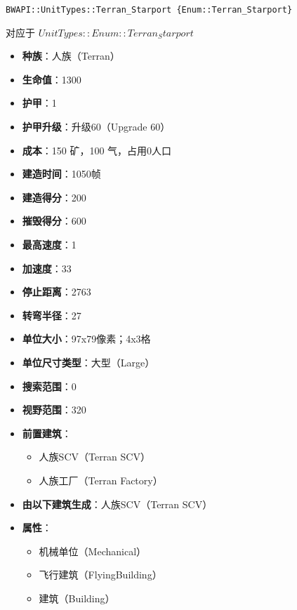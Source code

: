 \begin{tcolorbox}[colback=white, colframe=black!60!white, title=Terran\_Starport(), arc=0mm]
    \begin{verbatim}
BWAPI::UnitTypes::Terran_Starport {Enum::Terran_Starport}
    \end{verbatim}
    对应于  $ UnitTypes::Enum::Terran_Starport $ 
    \begin{itemize}
        \item \textbf{种族}：人族（Terran）
        \item \textbf{生命值}：1300
        \item \textbf{护甲}：1
        \item \textbf{护甲升级}：升级60（Upgrade 60）
        \item \textbf{成本}：150 矿，100 气，占用0人口
        \item \textbf{建造时间}：1050帧
        \item \textbf{建造得分}：200
        \item \textbf{摧毁得分}：600
        \item \textbf{最高速度}：1
        \item \textbf{加速度}：33
        \item \textbf{停止距离}：2763
        \item \textbf{转弯半径}：27
        \item \textbf{单位大小}：97x79像素；4x3格
        \item \textbf{单位尺寸类型}：大型（Large）
        \item \textbf{搜索范围}：0
        \item \textbf{视野范围}：320
        \item \textbf{前置建筑}：
            \begin{itemize}
                \item 人族SCV（Terran SCV）
                \item 人族工厂（Terran Factory）
            \end{itemize}
        \item \textbf{由以下建筑生成}：人族SCV（Terran SCV）
        \item \textbf{属性}：
            \begin{itemize}
                \item 机械单位（Mechanical）
                \item 飞行建筑（FlyingBuilding）
                \item 建筑（Building）
            \end{itemize}
    \end{itemize}
\end{tcolorbox}


